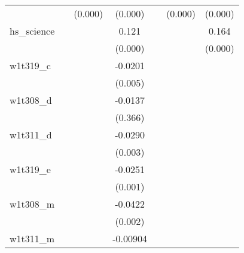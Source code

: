 {\begin{tabular}{l*{6}{c}}
            &                     &     (0.000)         &     (0.000)         &                     &     (0.000)         &     (0.000)         \\
[1em]
hs\_science  &                     &                     &       0.121\sym{***}&                     &                     &       0.164\sym{***}\\
            &                     &                     &     (0.000)         &                     &                     &     (0.000)         \\
[1em]
w1t319\_c    &                     &                     &     -0.0201\sym{***}&                     &                     &                     \\
            &                     &                     &     (0.005)         &                     &                     &                     \\
[1em]
w1t308\_d    &                     &                     &     -0.0137         &                     &                     &                     \\
            &                     &                     &     (0.366)         &                     &                     &                     \\
[1em]
w1t311\_d    &                     &                     &     -0.0290\sym{***}&                     &                     &                     \\
            &                     &                     &     (0.003)         &                     &                     &                     \\
[1em]
w1t319\_e    &                     &                     &     -0.0251\sym{***}&                     &                     &                     \\
            &                     &                     &     (0.001)         &                     &                     &                     \\
[1em]
w1t308\_m    &                     &                     &     -0.0422\sym{***}&                     &                     &                     \\
            &                     &                     &     (0.002)         &                     &                     &                     \\
[1em]
w1t311\_m    &                     &                     &    -0.00904         &                     &                     &                     \\

\end{tabular}}
